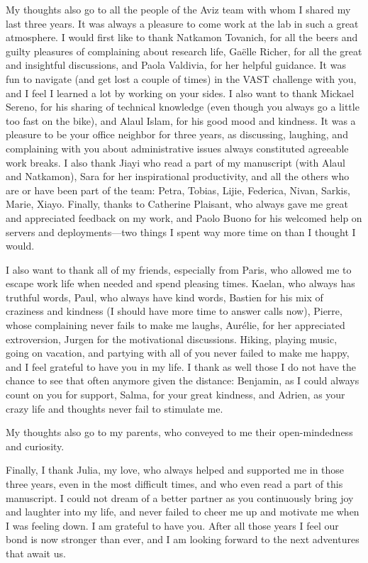 My thoughts also go to all the people of the Aviz team with whom I shared my last three years. It was always a pleasure to come work at the lab in such a great atmosphere.
I would first like to thank Natkamon Tovanich, for all the beers and guilty pleasures of complaining about research life, Gaëlle Richer, for all the great and insightful discussions, and Paola Valdivia, for her helpful guidance.
It was fun to navigate (and get lost a couple of times) in the VAST challenge with you, and I feel I learned a lot by working on your sides.
I also want to thank Mickael Sereno, for his sharing of technical knowledge (even though you always go a little too fast on the bike), and Alaul Islam, for his good mood and kindness. It was a pleasure to be your office neighbor for three years, as discussing, laughing, and complaining with you about administrative issues always constituted agreeable work breaks.
I also thank Jiayi who read a part of my manuscript (with Alaul and Natkamon), Sara for her inspirational productivity, and all the others who are or have been part of the team: Petra, Tobias, Lijie, Federica, Nivan, Sarkis, Marie, Xiayo.
Finally, thanks to Catherine Plaisant, who always gave me great and appreciated feedback on my work, and Paolo Buono for his welcomed help on servers and deployments---two things I spent way more time on than I thought I would.


I also want to thank all of my friends, especially from Paris, who allowed me to escape work life when needed and spend pleasing times.
Kaelan, who always has truthful words, Paul, who always have kind words, Bastien for his mix of craziness and kindness (I should have more time to answer calls now), Pierre, whose complaining never fails to make me laughs, Aurélie, for her appreciated extroversion, Jurgen for the motivational discussions.
Hiking, playing music, going on vacation, and partying with all of you never failed to make me happy, and I feel grateful to have you in my life.
I thank as well those I do not have the chance to see that often anymore given the distance: Benjamin, as I could always count on you for support, Salma, for your great kindness, and Adrien, as your crazy life and thoughts never fail to stimulate me.



My thoughts also go to my parents, who conveyed to me their open-mindedness and curiosity.

Finally, I thank Julia, my love, who always helped and supported me in those three years, even in the most difficult times, and who even read a part of this manuscript.
I could not dream of a better partner as you continuously bring joy and laughter into my life, and never failed to cheer me up and motivate me when I was feeling down. I am grateful to have you.
After all those years I feel our bond is now stronger than ever, and I am looking forward to the next adventures that await us.










